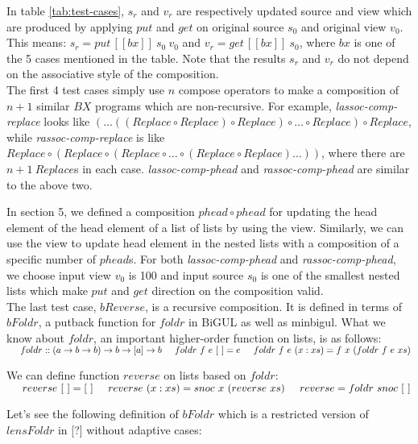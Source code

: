 \documentclass[runningheads]{llncs}
\newcommand{\tab}{\hspace*{5mm}}
\newcommand{\putbx}[3]{put \, [\![#1]\!] \ #2 \ #3}
\newcommand{\getbx}[2]{get \, [\![#1]\!] \ #2}
\begin{document}
In table \ref{tab:test-cases}, $s_r$ and $v_r$ are respectively updated source and view which are produced by applying $put$ and $get$ on original source $s_0$ and original view $v_0$. This means: $s_r = \putbx{bx}{s_0}{v_0}$ and $v_r = \getbx{bx}{s_0}$, where $bx$ is one of the 5 cases mentioned in the table. Note that the results $s_r$ and $v_r$ do not depend on the associative style of the composition.\\

The first 4 test cases simply use $n$ compose operators to make a composition of $n + 1$ similar $BX$ programs which are non-recursive. For example, \textit{lassoc-comp-replace} looks like $(\ldots((Replace \circ Replace) \circ Replace) \circ \ldots \circ Replace) \circ Replace$, while \textit{rassoc-comp-replace} is like $Replace \circ (Replace \circ (Replace \circ \ldots \circ (Replace \circ Replace)\ldots))$, where there are $n + 1 \ Replace$s in each case. \textit{lassoc-comp-phead} and \textit{rassoc-comp-phead} are similar to the above two.

In section 5, we defined a composition $phead \circ phead$ for updating the head element of the head element of a list of lists by using the view. Similarly, we can use the view to update head element in the nested lists with a composition of a specific number of $phead$s. For both \textit{lassoc-comp-phead} and \textit{rassoc-comp-phead}, we choose input view $v_0$ is 100 and input source $s_0$ is one of the smallest nested lists which make $put$ and $get$ direction on the composition valid.\\

The last test case, $bReverse$, is a recursive composition. It is defined in terms of $bFoldr$, a putback function for $foldr$ in BiGUL as well as minbigul. What we know about $foldr$, an important higher-order function on lists, is as follows:\\
    $\tab foldr :: (a \to b \to b) \to b \to [a] \to b\\
    \tab foldr \ f \ e \ [\ ] = e\\
    \tab foldr \ f \ e \ (x:xs) = f \ x \ (foldr \ f \ e \ xs)$

We can define function $reverse$ on lists based on $foldr$:\\
    $\tab reverse \ [\ ] = [\ ]\\
    \tab reverse \ (x:xs) = snoc \ x \ (reverse \ xs)\\
    \tab reverse = foldr \ snoc \ [\ ]$

Let's see the following definition of $bFoldr$ which is a restricted version of $lensFoldr$ in [?] without adaptive cases:
\end{document}
